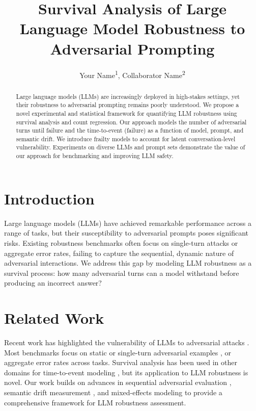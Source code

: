 \documentclass[letterpaper]{article}
\title{Survival Analysis of Large Language Model Robustness to Adversarial Prompting}
\author{
    Your Name\textsuperscript{\rm 1}, Collaborator Name\textsuperscript{\rm 2} \\
}
\begin{document}
\maketitle

\begin{abstract}
Large language models (LLMs) are increasingly deployed in high-stakes settings, yet their robustness to adversarial prompting remains poorly understood. We propose a novel experimental and statistical framework for quantifying LLM robustness using survival analysis and count regression. Our approach models the number of adversarial turns until failure and the time-to-event (failure) as a function of model, prompt, and semantic drift. We introduce frailty models to account for latent conversation-level vulnerability. Experiments on diverse LLMs and prompt sets demonstrate the value of our approach for benchmarking and improving LLM safety.
\end{abstract}

\section{Introduction}
Large language models (LLMs) have achieved remarkable performance across a range of tasks, but their susceptibility to adversarial prompts poses significant risks. Existing robustness benchmarks often focus on single-turn attacks or aggregate error rates, failing to capture the sequential, dynamic nature of adversarial interactions. We address this gap by modeling LLM robustness as a survival process: how many adversarial turns can a model withstand before producing an incorrect answer?

\section{Related Work}
Recent work has highlighted the vulnerability of LLMs to adversarial attacks \cite{zou2023universal, wei2023jailbroken, perez2022red}. Most benchmarks focus on static or single-turn adversarial examples \cite{hendrycks2021measuring, liang2023holistic}, or aggregate error rates across tasks. Survival analysis has been used in other domains for time-to-event modeling \cite{kleinbaum2012survival}, but its application to LLM robustness is novel. Our work builds on advances in sequential adversarial evaluation \cite{liu2023llm}, semantic drift measurement \cite{reimers2019sentence}, and mixed-effects modeling \cite{bates2015fitting} to provide a comprehensive framework for LLM robustness assessment.
\end{document}
